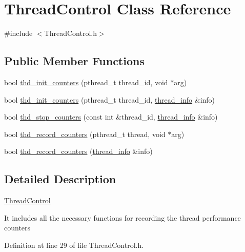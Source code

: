 \hypertarget{classThreadControl}{\section{Thread\-Control Class Reference}
\label{classThreadControl}
}


{\ttfamily \#include $<$Thread\-Control.\-h$>$}

\subsection*{Public Member Functions}
\begin{DoxyCompactItemize}
\item 
bool \hyperlink{classThreadControl_a3815813a93f12ae7a699ff0bf3090c19}{thd\-\_\-init\-\_\-counters} (pthread\-\_\-t thread\-\_\-id, void $\ast$arg)
\item 
bool \hyperlink{classThreadControl_acf328e5da7324314bcc3380e6e75de95}{thd\-\_\-init\-\_\-counters} (pthread\-\_\-t thread\-\_\-id, \hyperlink{structthread__info}{thread\-\_\-info} \&info)
\item 
bool \hyperlink{classThreadControl_a27b61f21b34d679d262ac31fea1a0029}{thd\-\_\-stop\-\_\-counters} (const int \&thread\-\_\-id, \hyperlink{structthread__info}{thread\-\_\-info} \&info)
\item 
bool \hyperlink{classThreadControl_a61d268caa2b8dd55ef1c412fa86ada25}{thd\-\_\-record\-\_\-counters} (pthread\-\_\-t thread, void $\ast$arg)
\item 
bool \hyperlink{classThreadControl_ac2d690ddd11e212efad6b2381ad0cce4}{thd\-\_\-record\-\_\-counters} (\hyperlink{structthread__info}{thread\-\_\-info} \&info)
\end{DoxyCompactItemize}


\subsection{Detailed Description}
\hyperlink{classThreadControl}{Thread\-Control}

It includes all the necessary functions for recording the thread performance counters 

Definition at line 29 of file Thread\-Control.\-h.



